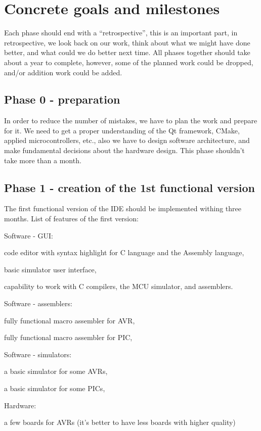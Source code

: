 \documentclass[a4paper,twoside,15pt]{book}
\begin{document}
\chapter{Concrete goals and milestones}
	Each phase should end with a ``retrospective'', this is an important part, in retrospective, we look back on our work, think about what we might have done better, and what could we do better next time. All phases together should take about a year to complete, however, some of the planned work could be dropped, and/or addition work could be added.

	\section{Phase 0 - preparation}
		In order to reduce the number of mistakes, we have to plan the work and prepare for it. We need to get a proper understanding of the Qt framework, CMake, applied microcontrollers, etc., also we have to design software architecture, and make fundamental decisions about the hardware design. This phase shouldn't take more than a month.

	\section{Phase 1 - creation of the 1st functional version}
		The first functional version of the IDE should be implemented withing three months. List of features of the first version:
		\begin{dinglist}{73}
			\item Software - GUI:
				\begin{dinglist}{75}
					\item code editor with syntax highlight for C language and the Assembly language,
					\item basic simulator user interface,
					\item capability to work with C compilers, the MCU simulator, and assemblers.
				\end{dinglist}
			\item Software - assemblers:
				\begin{dinglist}{75}
					\item fully functional macro assembler for AVR,
					\item fully functional macro assembler for PIC,
				\end{dinglist}
			\item Software - simulators:
				\begin{dinglist}{75}
					\item a basic simulator for some AVRs,
					\item a basic simulator for some PICs,
				\end{dinglist}
			\item Hardware:
				\begin{dinglist}{75}
					\item a few boards for AVRs (it's better to have less boards with higher quality)
				\end{dinglist}
		\end{dinglist}
		
\end{document}

